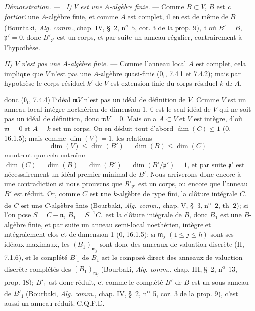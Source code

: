 \documentclass[10pt,oneside]{book}
\newcommand{\oldpage}[2][]{%
  \setcounter{footnote}{0}%
  \marginpar{\scriptsize\textbf{#1}~|~#2}\ignorespaces}
\newenvironment{proof}{%
  \par\medskip\noindent\textit{Démonstration. ---\ }}{\par}
\begin{document}
\begin{proof}
\emph{I) $V$ est une $A$-algèbre finie.} --- Comme $B\subset V$, $B$ est
\emph{a fortiori} une $A$-algèbre finie, et comme $A$ est complet, il en est
de même de $B$ (Bourbaki, \emph{Alg. comm.}, chap. IV, \S~2,
n\textsuperscript{o}~5, cor. 3 de la prop. 9), d'où $B'=B$,
$\mathfrak p'=0$, donc $B'_{\mathfrak p'}$ est un corps, et par suite un
anneau régulier, contrairement à l'hypothèse.

\emph{II) $V$ n'est pas une $A$-algèbre finie.} --- Comme l'anneau local
$A$ est complet, cela implique que $V$ n'est pas une $A$-algèbre
quasi-finie (0$_{\mathrm I}$, 7.4.1 et 7.4.2); mais par hypothèse le corps
résiduel $k'$ de $V$ est extension finie du corps résiduel $k$ de $A$,

\oldpage[IV-2]{202}

donc (0$_{\mathrm I}$, 7.4.4) l'idéal $\mathfrak mV$ n'est pas un idéal de
définition de $V$. Comme $V$ est un anneau local intègre noethérien de
dimension 1, 0 est le seul idéal de $V$ qui ne soit pas un idéal de
définition, donc $\mathfrak mV=0$. Mais on a $A\subset V$ et $V$ est
intègre, d'où $\mathfrak m=0$ et $A=k$ est un corps. On en déduit tout
d'abord $\dim(C)\leqslant1$ (0, 16.1.5); mais comme $\dim(V)=1$, les
relations
\[
\dim(V)\leqslant\dim(B')=\dim(B)\leqslant\dim(C)
\]
montrent que cela entraîne
$\dim(C)=\dim(B)=\dim(B')=\dim(B'/\mathfrak p')=1$, et par suite
$\mathfrak p'$ est nécessairement un idéal premier minimal de $B'$. Nous
arriverons donc encore à une contradiction si nous prouvons que
$B'_{\mathfrak p'}$ est un corps, ou encore que l'anneau $B'$ est réduit.
Or, comme $C$ est une $k$-algèbre de type fini, la clôture intégrale $C_1$
de $C$ est une $C$-algèbre finie (Bourbaki, \emph{Alg. comm.}, chap. V,
\S~3, n\textsuperscript{o}~2, th. 2); si l'on pose
$S=C-\mathfrak n$, $B_1=S^{-1}C_1$ est la clôture intégrale de $B$, donc
$B_1$ est une $B$-algèbre finie, et par suite un anneau semi-local
noethérien, intègre et intégralement clos et de dimension 1 (0, 16.1.5); si
$\mathfrak m_j$ $(1\leqslant j\leqslant h)$ sont ses idéaux maximaux, les
$(B_1)_{\mathfrak m_j}$ sont donc des anneaux de valuation discrète (II,
7.1.6), et le complété $B'_1$ de $B_1$ est le composé direct des anneaux de
valuation discrète complétés des $(B_1)_{\mathfrak m_j}$ (Bourbaki,
\emph{Alg. comm.}, chap. III, \S~2, n\textsuperscript{o}~13, prop. 18);
$B'_1$ est donc réduit, et comme le complété $B'$ de $B$ est un
sous-anneau de $B'_1$ (Bourbaki, \emph{Alg. comm.}, chap. IV, \S~2,
n\textsuperscript{o}~5, cor. 3 de la prop. 9), c'est aussi un anneau réduit.
C.Q.F.D.
\end{proof}
\end{document}
